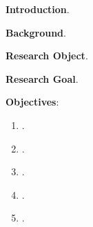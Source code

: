 \documentclass[
     english, %
    monochrome, %
]{VUMIFSEMasterThesis}
\title{}
\author{Vytautas Lėveris}
\date{Vilnius – \the\year}
\begin{document}
\maketitle








\textbf{Introduction}.

\textbf{Background}.

\textbf{Research Object}.

\textbf{Research Goal}.

\textbf{Objectives}:
\begin{enumerate}
\item .
\item .
\item .
\item .
\item .
\end{enumerate}
\end{document}
